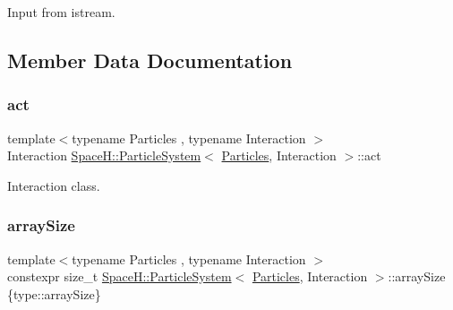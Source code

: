 Input from istream. 



\subsection{Member Data Documentation}
\mbox{\label{class_space_h_1_1_particle_system_a9fa9c5d8996d8574f7fdd0b201f3383e}} 
\subsubsection{\texorpdfstring{act}{act}}
{\footnotesize\ttfamily template$<$typename Particles , typename Interaction $>$ \\
Interaction \mbox{\hyperlink{class_space_h_1_1_particle_system}{Space\+H\+::\+Particle\+System}}$<$ \mbox{\hyperlink{struct_space_h_1_1_particles}{Particles}}, Interaction $>$\+::act\hspace{0.3cm}{\ttfamily [protected]}}



Interaction class. 

\mbox{\label{class_space_h_1_1_particle_system_a63bedef5e42ff18291a6c7c231decf24}} 
\subsubsection{\texorpdfstring{array\+Size}{arraySize}}
{\footnotesize\ttfamily template$<$typename Particles , typename Interaction $>$ \\
constexpr size\+\_\+t \mbox{\hyperlink{class_space_h_1_1_particle_system}{Space\+H\+::\+Particle\+System}}$<$ \mbox{\hyperlink{struct_space_h_1_1_particles}{Particles}}, Interaction $>$\+::array\+Size \{type\+::array\+Size\}\hspace{0.3cm}{\ttfamily [static]}}

\mbox{\label{class_space_h_1_1_particle_system_aa82364f412d9de96503478f116b7b77b}} 
